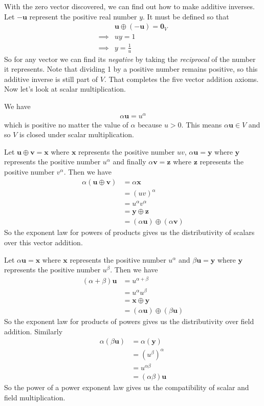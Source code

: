{With the zero vector discovered, we can find out how to make additive inverses. Let $-\mathbf{u}$ represent the positive real number $y$. It must be defined so that
\begin{align*}
& \mathbf{u} \oplus (-\mathbf{u}) = \mathbf{0}_V \\
\implies & uy = 1 \\
\implies & y = \frac{1}{u}
\end{align*}
So for any vector we can find its \textit{negative} by taking the \textit{reciprocal} of the number it represents. Note that dividing 1 by a positive number remains positive, so this additive inverse is still part of $V$. That completes the five vector addition axioms. Now let's look at scalar multiplication.

We have
\begin{align*}
\alpha \mathbf{u} = u^\alpha
\end{align*}
which is positive no matter the value of $\alpha$ because $u >0$. This means $\alpha \mathbf{u} \in V$ and so $V$ is closed under scalar multiplication.

Let $\mathbf{u} \oplus \mathbf{v} = \mathbf{x}$ where $\mathbf{x}$ represents the positive number $uv$, $\alpha\mathbf{u} = \mathbf{y}$ where $\mathbf{y}$ represents the positive number $u^\alpha$ and finally $\alpha\mathbf{v} = \mathbf{z}$ where $\mathbf{z}$ represents the positive number $v^\alpha$. Then we have
\begin{align*}
\alpha(\mathbf{u} \oplus \mathbf{v}) &= \alpha \mathbf{x}\\
&= (uv)^\alpha \\
&= u^\alpha v^\alpha \\
&= \mathbf{y} \oplus \mathbf{z} \\
&= (\alpha\mathbf{u}) \oplus (\alpha\mathbf{v})
\end{align*}
So the exponent law for powers of products gives us the distributivity of scalars over this vector addition.

Let $\alpha\mathbf{u} = \mathbf{x}$ where $\mathbf{x}$ represents the positive number $u^\alpha$ and $\beta\mathbf{u} = \mathbf{y}$ where $\mathbf{y}$ represents the positive number $u^\beta$. Then we have
\begin{align*}
(\alpha+\beta)\mathbf{u} &= u^{\alpha+\beta} \\
&= u^\alpha u^\beta \\
&= \mathbf{x} \oplus \mathbf{y} \\
&= (\alpha\mathbf{u}) \oplus (\beta\mathbf{u})
\end{align*}
So the exponent law for products of powers gives us the distributivity over field addition. Similarly
\begin{align*}
\alpha(\beta\mathbf{u}) &= \alpha(\mathbf{y}) \\
&= (u^\beta)^\alpha \\
&= u^{\alpha\beta} \\
&= (\alpha\beta)\mathbf{u}
\end{align*}
So the power of a power exponent law gives us the compatibility of scalar and field multiplication.

}
